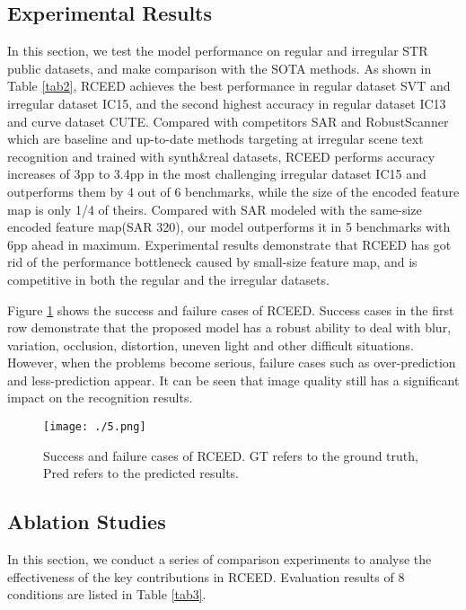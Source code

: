 \documentclass[runningheads]{llncs}
\begin{document}
\subsection{Experimental Results}
In this section, we test the model performance on regular and irregular STR public datasets, and make comparison with the SOTA methods. As shown in Table \ref{tab2}, RCEED achieves the best performance in regular dataset SVT and irregular dataset IC15, and the second highest accuracy in regular dataset IC13 and curve dataset CUTE. Compared with competitors SAR\cite{li2019show} and RobustScanner\cite{yue2020robustscanner} which are baseline and up-to-date methods targeting at irregular scene text recognition and trained with synth\&real datasets, RCEED performs accuracy increases of 3pp to 3.4pp in the most challenging irregular dataset IC15 and outperforms them by 4 out of 6 benchmarks, while the size of the encoded feature map is only 1/4 of theirs. Compared with SAR modeled with the same-size encoded feature map(SAR 320), our model outperforms it in 5 benchmarks with 6pp ahead in maximum. Experimental results demonstrate that RCEED has got rid of the performance bottleneck caused by small-size feature map, and is competitive in both the regular and the irregular datasets.

Figure \ref{Fig.5} shows the success and failure cases of RCEED. Success cases in the first row demonstrate that the proposed model has a robust ability to deal with blur, variation, occlusion, distortion, uneven light and other difficult situations. However, when the problems become serious, failure cases such as over-prediction and less-prediction appear. It can be seen that image quality still has a significant impact on the recognition results.

\begin{figure}
\vspace{-0.3cm} 
\setlength{\belowcaptionskip}{-0.5cm} 
\centering
\texttt{[image: ./5.png]}
\caption{Success and failure cases of RCEED. GT refers to the ground truth, Pred refers to the predicted results. } 
\label{Fig.5}
\end{figure}

\subsection{Ablation Studies}
In this section, we conduct a series of comparison experiments to analyse the effectiveness of the key contributions in RCEED. Evaluation results of 8 conditions are listed in Table \ref{tab3}.
\end{document}
